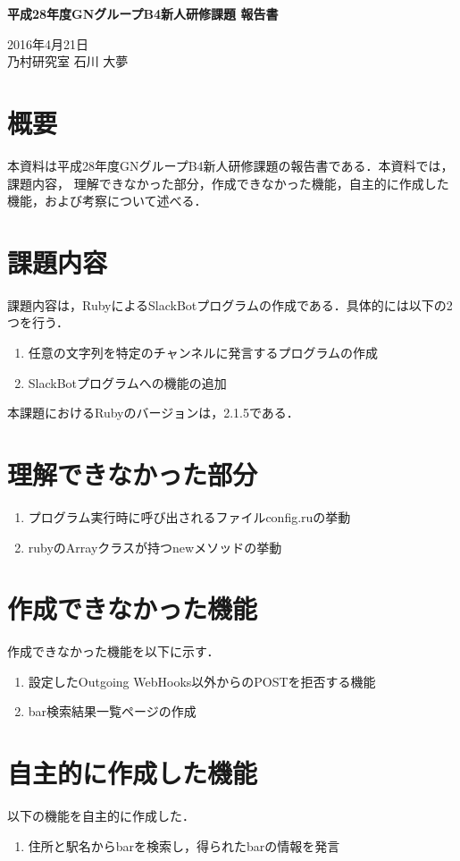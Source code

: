 \documentclass[fleqn, 14pt]{extarticlej}
\begin{document}
\begin{center}
{\Large {\bf 平成28年度GNグループB4新人研修課題 報告書}}

\end{center}
\begin{flushright}
2016年4月21日\\

乃村研究室 石川 大夢
\end{flushright}

\section{概要}
本資料は平成28年度GNグループB4新人研修課題の報告書である．本資料では，課題内容，
理解できなかった部分，作成できなかった機能，自主的に作成した機能，および考察について述べる．

\section{課題内容}
課題内容は，RubyによるSlackBotプログラムの作成である．具体的には以下の2つを行う．
\begin{enumerate}
  \item 任意の文字列を特定のチャンネルに発言するプログラムの作成
  \item SlackBotプログラムへの機能の追加
\end{enumerate}
本課題におけるRubyのバージョンは，2.1.5である．
\section{理解できなかった部分}
\begin{enumerate}
\item プログラム実行時に呼び出されるファイルconfig.ruの挙動
\item rubyのArrayクラスが持つnewメソッドの挙動
\end{enumerate}

\section{作成できなかった機能}
作成できなかった機能を以下に示す．
\begin{enumerate}
\item 設定したOutgoing WebHooks以外からのPOSTを拒否する機能
\item bar検索結果一覧ページの作成
\end{enumerate}

\section{自主的に作成した機能}
以下の機能を自主的に作成した．
\begin{enumerate}
\item 住所と駅名からbarを検索し，得られたbarの情報を発言
\end{enumerate}
\end{document}

